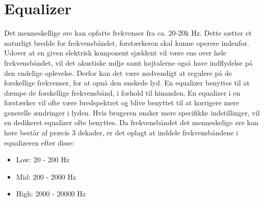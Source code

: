 \section{Equalizer}
\label{equalizer}
Det menneskellige øre kan opfatte frekvenser fra ca. 20-20k Hz. Dette sætter et naturligt bredde for frekvensbåndet, forstærkeren skal kunne operere indenfor. Udover at en given elektrisk komponent sjældent vil være ens over hele frekvensbåndet, vil det akustiske miljø samt højtalerne også have indflydelse på den endelige oplevelse.  Derfor kan det være nødvendigt at regulere på de forskellige frekvenser, for at opnå den ønskede lyd. En equalizer benyttes til at dæmpe de forskellige frekvensbånd, i forhold til hinanden. En equalizer i en forstærker vil ofte være bredspektret og blive benyttet til at korrigere mere generelle ændringer i lyden. Hvis brugeren ønsker mere specifikke indstillinger, vil en dedikeret equalizer ofte benyttes. Da frekvensbåndet det menneskelige øre kan høre består af præcis 3 dekader, er det oplagt at inddele frekvensbåndene i equalizeren efter disse:

\begin{itemize}
\item Low: 20 - 200 Hz
\item Mid: 200 - 2000 Hz
\item High: 2000 - 20000 Hz
\end{itemize}

